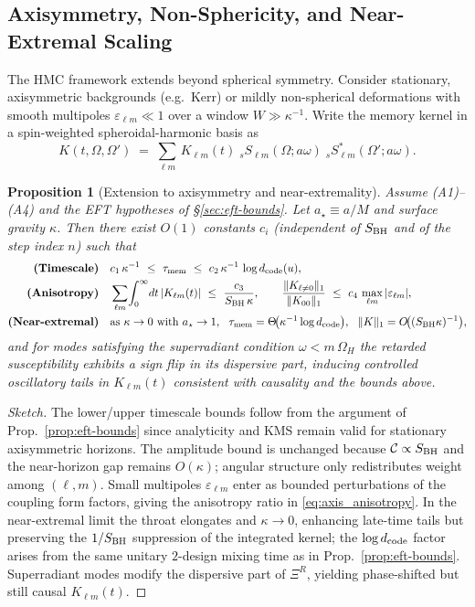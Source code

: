 \documentclass[aps,prd,preprint,onecolumn,superscriptaddress,nofootinbib,longbibliography,floatfix,11pt,showpacs,showkeys]{revtex4-2}
\newcommand{\HMC}{\textsc{HMC}\xspace}
\theoremstyle{plain}
\newtheorem{proposition}[theorem]{Proposition}
\theoremstyle{definition}
\theoremstyle{remark}
\begin{document}
\subsection{Axisymmetry, Non-Sphericity, and Near-Extremal Scaling}
\label{sec:axisymmetry}
The \HMC{} framework extends beyond spherical symmetry. Consider stationary, axisymmetric backgrounds (e.g.~Kerr) or mildly
non-spherical deformations with smooth multipoles $\varepsilon_{\ell m}\ll 1$ over a window $W\gg \kappa^{-1}$.
Write the memory kernel in a spin-weighted spheroidal-harmonic basis as
\begin{equation}
K(t,\Omega,\Omega') \;=\; \sum_{\ell m}\,K_{\ell m}(t)\;{}_{s}S_{\ell m}(\Omega;a\omega)\;{}_{s}S^{\ast}_{\ell m}(\Omega';a\omega).\label{eq:kernel_anisotropic}
\end{equation}
\begin{proposition}[Extension to axisymmetry and near-extremality]\label{prop:axisymmetry}
Assume (A1)--(A4) and the EFT hypotheses of \S\ref{sec:eft-bounds}. Let $a_\star\equiv a/M$ and surface gravity $\kappa$.
Then there exist $O(1)$ constants $c_i$ (independent of $S_{\rm BH}$ and of the step index $n$) such that
\begin{align}
\textbf{(Timescale)}\quad& c_1\,\kappa^{-1}\ \le\ \tau_{\rm mem}\ \le\ c_2\,\kappa^{-1}\,\log d_{\rm code}(u),\label{eq:axis_timescale}\\
\textbf{(Anisotropy)}\quad& \sum_{\ell m}\!\int_0^\infty\!dt\,|K_{\ell m}(t)|\ \le\ \frac{c_3}{S_{\rm BH}\,\kappa},
\qquad
\frac{\|K_{\ell\neq 0}\|_1}{\|K_{00}\|_1}\ \le\ c_4\,\max_{\ell m}|\varepsilon_{\ell m}|,\label{eq:axis_anisotropy}\\
\textbf{(Near-extremal)}\quad& \text{as }\kappa\to 0 \text{ with } a_\star\to 1,\ \ 
\tau_{\rm mem} = \Theta\!\big(\kappa^{-1}\log d_{\rm code}\big),
\ \ \|K\|_1 = O\!\big((S_{\rm BH}\kappa)^{-1}\big),\label{eq:axis_extremal}
\end{align}
and for modes satisfying the superradiant condition $\omega<m\,\Omega_H$ the retarded susceptibility exhibits a sign flip in its dispersive part, inducing
controlled oscillatory tails in $K_{\ell m}(t)$ consistent with causality and the bounds above.
\end{proposition}
\begin{proof}[Sketch]
The lower/upper timescale bounds follow from the argument of Prop.~\ref{prop:eft-bounds} since analyticity and KMS remain valid for
stationary axisymmetric horizons. The amplitude bound is unchanged because $\mathcal{C}\propto S_{\rm BH}$ and the near-horizon gap
remains $O(\kappa)$; angular structure only redistributes weight among $(\ell,m)$. Small multipoles $\varepsilon_{\ell m}$ enter as
bounded perturbations of the coupling form factors, giving the anisotropy ratio in \eqref{eq:axis_anisotropy}. In the near-extremal
limit the throat elongates and $\kappa\to 0$, enhancing late-time tails but preserving the $1/S_{\rm BH}$ suppression of the integrated
kernel; the $\log d_{\rm code}$ factor arises from the same unitary $2$-design mixing time as in Prop.~\ref{prop:eft-bounds}. Superradiant
modes modify the dispersive part of $\Xi^R$, yielding phase-shifted but still causal $K_{\ell m}(t)$.\end{proof}
\end{document}
